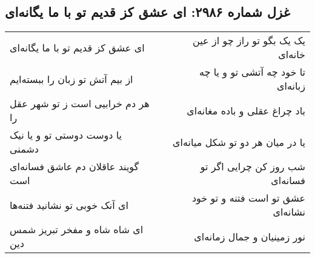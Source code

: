 \begin{center}
\section*{غزل شماره ۲۹۸۶: ای عشق کز قدیم تو با ما یگانه‌ای}
\label{sec:2986}
\begin{longtable}{l p{0.5cm} r}
ای عشق کز قدیم تو با ما یگانه‌ای
&&
یک یک بگو تو راز چو از عین خانه‌ای
\\
از بیم آتش تو زبان را ببسته‌ایم
&&
تا خود چه آتشی تو و یا چه زبانه‌ای
\\
هر دم خرابیی است ز تو شهر عقل را
&&
باد چراغ عقلی و باده مغانه‌ای
\\
یا دوست دوستی تو و یا نیک دشمنی
&&
یا در میان هر دو تو شکل میانه‌ای
\\
گویند عاقلان دم عاشق فسانه‌ای است
&&
شب روز کن چرایی اگر تو فسانه‌ای
\\
ای آنک خوبی تو نشانید فتنه‌ها
&&
عشق تو است فتنه و تو خود نشانه‌ای
\\
ای شاه شاه و مفخر تبریز شمس دین
&&
نور زمینیان و جمال زمانه‌ای
\\
\end{longtable}
\end{center}
